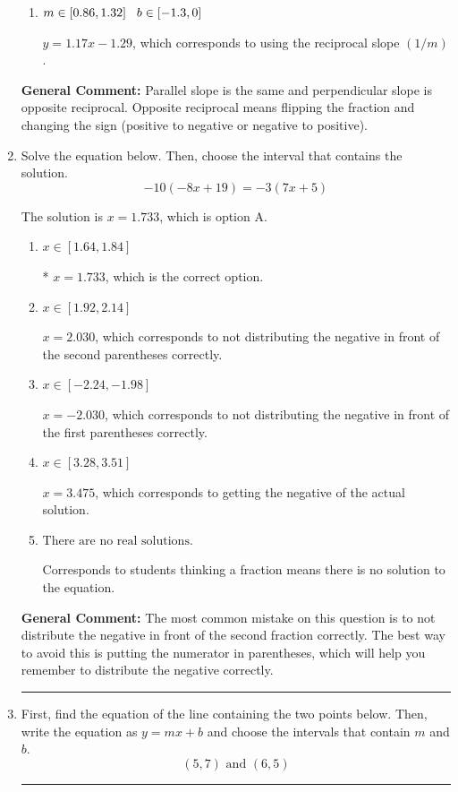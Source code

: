 \documentclass{extbook}[14pt]
\newcommand{\litem}[1]{\item #1

\rule{\textwidth}{0.4pt}}
\begin{document}
\begin{enumerate}
{\begin{enumerate}[label=\Alph*.]
 $y = 0.86x + 1.29$, which corresponds to using the correct slope and getting the negative $y$-intercept.
\item \( m \in [0.86, 1.32] \hspace*{3mm} b \in [-1.3, 0] \)

 $y = 1.17x - 1.29$, which corresponds to using the reciprocal slope $(1/m)$.
\end{enumerate}

\textbf{General Comment:} Parallel slope is the same and perpendicular slope is opposite reciprocal. Opposite reciprocal means flipping the fraction and changing the sign (positive to negative or negative to positive).
}
\litem{
Solve the equation below. Then, choose the interval that contains the solution.
\[ -10(-8x + 19) = -3(7x + 5) \]

The solution is \( x = 1.733 \), which is option A.\begin{enumerate}[label=\Alph*.]
\item \( x \in [1.64, 1.84] \)

* $x = 1.733$, which is the correct option.
\item \( x \in [1.92, 2.14] \)

$x = 2.030$, which corresponds to not distributing the negative in front of the second parentheses correctly.
\item \( x \in [-2.24, -1.98] \)

$x = -2.030$, which corresponds to not distributing the negative in front of the first parentheses correctly.
\item \( x \in [3.28, 3.51] \)

$x = 3.475$, which corresponds to getting the negative of the actual solution.
\item \( \text{There are no real solutions.} \)

Corresponds to students thinking a fraction means there is no solution to the equation.
\end{enumerate}

\textbf{General Comment:} The most common mistake on this question is to not distribute the negative in front of the second fraction correctly. The best way to avoid this is putting the numerator in parentheses, which will help you remember to distribute the negative correctly.
}
\litem{
First, find the equation of the line containing the two points below. Then, write the equation as $ y=mx+b $ and choose the intervals that contain $m$ and $b$.
\[ (5, 7) \text{ and } (6, 5) \]

}
\end{enumerate}
\end{document}

